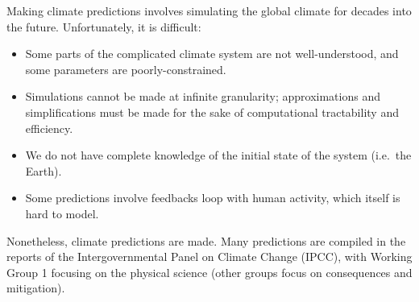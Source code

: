 \documentclass[letterpaper,12pt]{article}
\begin{document}
Making climate predictions involves simulating the global climate for decades into the future. Unfortunately, it is difficult:
\begin{itemize}
  \item Some parts of the complicated climate system are not well-understood, and some parameters are poorly-constrained.
  \item Simulations cannot be made at infinite granularity; approximations and simplifications must be made for the sake of computational tractability and efficiency.
  \item We do not have complete knowledge of the initial state of the system (i.e.~the Earth).
  \item Some predictions involve feedbacks loop with human activity, which itself is hard to model.
\end{itemize}
Nonetheless, climate predictions are made. Many predictions are compiled in the reports of the Intergovernmental Panel on Climate Change (IPCC), with Working Group 1 \citeyearpar{ipcc2021physical} focusing on the physical science (other groups focus on consequences and mitigation).
\end{document}
